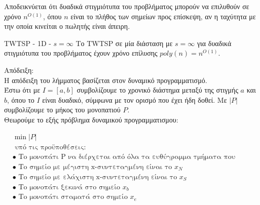 \documentclass[oneside,12pt]{book}
\theoremstyle{definition}
\begin{document}
Αποδεικνύεται ότι δυαδικά στιγμιότυπα του προβλήματος μπορούν να επιλυθούν σε χρόνο \(n^{Ο(1)}\), όπου \(n\) είναι το πλήθος των σημείων προς επίσκεψη, αν η ταχύτητα με την οποία κινείται ο πωλητής είναι άπειρη. \\

\begin{mylemma}{TWTSP - 1D - \(s = \infty\)}{}
	Το TWTSP σε μία διάσταση με \(s = \infty\) για δυαδικά στιγμιότυπα του προβλήματος έχουν χρόνο επίλυσης \(poly(n) = n^{O(1)}\).
\end{mylemma}

Απόδειξη: \\
Η απόδειξη του λήμματος βασίζεται στον δυναμικό προγραμματισμό. \\
Έστω ότι με \(I = [a,b]\) συμβολίζουμε το χρονικό διάστημα μεταξύ της στιγμής \(a\) και \(b\), όπου το \(I\) είναι δυαδικό, σύμφωνα με τον ορισμό που έχει ήδη δοθεί. Με \(|P|\) συμβολίζουμε το μήκος του μονοπατιού \(P\). \\
Θεωρούμε το εξής πρόβλημα δυναμικού προγραμματισμου:

\begin{align*}
	&\min |P| \\
	&\text{ υπό τις προϋποθέσεις:} \\
	&\bullet \text{ Το μονοπάτι P να διέρχεται από όλα τα ευθύγραμμα τμήματα που βρίσκονται εντός του I} \\
	&\bullet \text{ Το σημείο με μέγιστη x-συντεταγμένη είναι το } x_N  \\
	&\bullet \text{ Το σημείο με ελάχιστη x-συντεταγμένη είναι το } x_S  \\	
	&\bullet \text{ Το μονοπάτι ξεκινά στο σημείο } x_b \\
	&\bullet \text{ Το μονοπάτι σταματά στο σημείο } x_e
\end{align*}
\end{document}
